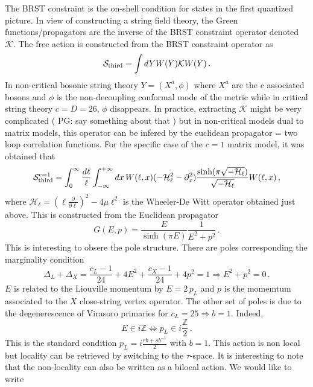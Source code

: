 \documentclass[a4paper]{article}
\newcommand{\purple}[1]{{\color{purple} #1 \color{black}}}
\newcommand{\PG}[1]{{\purple{PG: #1}}} %
\begin{document}
The BRST constraint is the on-shell condition for states in the first quantized picture. In view of constructing a string field theory, the Green functions/propagators are the inverse of the BRST constraint operator denoted $\mathcal{K}$. The free action is constructed from the BRST constraint operator as 
\begin{equation}
  \mathcal{S}_{\rm third} = \int dY W(Y) \mathcal{K} W(Y)\,.
\end{equation}  
In non-critical bosonic string theory $Y = (X^a,\phi)$ where $X^a$ are the $c$ associated bosons and $\phi$ is the non-decoupling conformal mode of the metric while in critical string theory $c=D=26$, $\phi$ disappears. In practice, extracting $\mathcal{K}$ might be very complicated (\PG{say something about that}) but in non-critical models dual to matrix models, this operator can be infered by the euclidean propagator = two loop correlation functions. For the specific case of the $c=1$ matrix model, it was obtained that
\begin{equation}
  \mathcal{S}^{\rm c=1}_{\rm third} = \int_0^{\infty}\frac{d\ell}{\ell} \int_{-\infty}^{+\infty} dx \,W(\ell,x)(-\mathcal{H}_\ell^2-\partial_x^2) \frac{\sinh(\pi \sqrt{-\mathcal{H}_{\ell}})}{\sqrt{-\mathcal{H}_{\ell}}} W(\ell,x)\,,
\end{equation}
where $\mathcal{H}_{\ell} = \left(\ell \frac{\partial}{\partial \ell}\right)^2 - 4\mu \ell^2$ is the Wheeler-De Witt operator obtained just above. This is constructed from the Euclidean propagator
\begin{equation}
  G(E,p) = \frac{E}{\sinh(\pi E)} \frac{1}{E^2 + p^2}\,.
\end{equation}
This is interesting to obsere the pole structure. There are poles corresponding the marginality condition
\begin{equation}
  \Delta_L + \Delta_X = \frac{c_L-1}{24}+4E^2 + \frac{c_X -1}{24} + 4p^2 = 1 \Rightarrow E^2 + p^2 = 0\,.
\end{equation}
$E$ is related to the Liouville momentum by $E = 2\,p_L$ and $p$ is the momemtum associated to the $X$ close-string vertex operator. The other set of poles is due to the degenerescence of Virasoro primaries for $c_L=25 \Rightarrow b =1$. Indeed,
\begin{equation}
  E \in i \mathbb{Z} \Leftrightarrow p_L \in i \frac{\mathbb{Z}}{2}\,.
\end{equation}
This is the standard condition $p_L = i\frac{rb + s b^{-1}}{2}$ with $b=1$.
This action is non local but locality can be retrieved by switching to the $\tau$-space. It is interesting to note that the non-locality can also be written as a bilocal action. We would like to write
\end{document}
